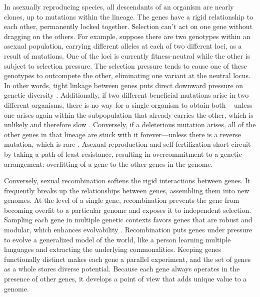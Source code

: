 \documentclass[11pt]{article}
\begin{document}
In asexually reproducing species, all descendants of an organism are nearly clones, up to mutations within the lineage. The genes have a rigid relationship to each other, permanently locked together. Selection can't act on one gene without dragging on the others. For example, suppose there are two genotypes within an asexual population, carrying different alleles at each of two different loci, as a result of mutations. One of the loci is currently fitness-neutral while the other is subject to selection pressure. The selection pressure tends to cause one of these genotypes to outcompete the other, eliminating one variant at the neutral locus. In other words, tight linkage between genes puts direct downward pressure on genetic diversity \citep{charlesworth1993effect, hudson1995deleterious}. Additionally, if two different beneficial mutations arise in two different organisms, there is no way for a single organism to obtain both -- unless one arises again within the subpopulation that already carries the other, which is unlikely and therefore slow \citep{hill1966effect, felsenstein1974evolutionary, weismann1889essays, fisher1930genetial, muller1932some, crow1965evolution}. Conversely, if a deleterious mutation arises, all of the other genes in that lineage are stuck with it forever---unless there is a reverse mutation, which is rare \citep{keightley2006interference, muller1932some}. Asexual reproduction and self-fertilization short-circuit by taking a path of least resistance, resulting in overcommitment to a genetic arrangement: overfitting of a gene to the other genes in the genome.

Conversely, sexual recombination softens the rigid interactions between genes. It frequently breaks up the relationships between genes, assembling them into new genomes. At the level of a single gene, recombination prevents the gene from becoming overfit to a particular genome and exposes it to independent selection. Sampling each gene in multiple genetic contexts favors genes that are robust and modular, which enhances evolvability \citep{livnat2008mixability, livnat2010sex, wagner1996perspective, holland1975adaptation,dawkins1976selfish, clune2013evolutionary, pigliucci2008evolvability, misevic2006sexual}. Recombination puts genes under pressure to evolve a generalized model of the world, like a person learning multiple languages and extracting the underlying commonalities. Keeping genes functionally distinct makes each gene a parallel experiment, and the set of genes as a whole stores diverse potential. Because each gene always operates in the presence of other genes, it develops a point of view that adds unique value to a genome.
\end{document}
